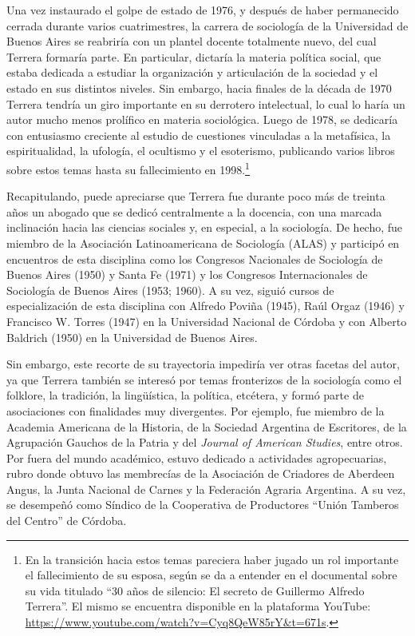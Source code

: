 Una vez instaurado el golpe de estado de 1976, y después de haber permanecido cerrada durante varios cuatrimestres, la carrera de sociología de la Universidad de Buenos Aires se reabriría con un plantel docente totalmente nuevo, del cual Terrera formaría parte. En particular, dictaría la materia política social, que estaba dedicada a estudiar la organización y articulación de la sociedad y el estado en sus distintos niveles. Sin embargo, hacia finales de la década de 1970 Terrera tendría un giro importante en su derrotero intelectual, lo cual lo haría un autor mucho menos prolífico en materia sociológica. Luego de 1978, se dedicaría con entusiasmo creciente al estudio de cuestiones vinculadas a la metafísica, la espiritualidad, la ufología, el ocultismo y el esoterismo, publicando varios libros sobre estos temas hasta su fallecimiento en 1998.\footnote{En la transición hacia estos temas pareciera haber jugado un rol importante el fallecimiento de su esposa, según se da a entender en el documental sobre su vida titulado \enquote{30 años de silencio: El secreto de Guillermo Alfredo Terrera}. El mismo se encuentra disponible en la plataforma YouTube: \url{https://www.youtube.com/watch?v=Cyq8QeW85rY\&t=671s}.}

Recapitulando, puede apreciarse que Terrera fue durante poco más de treinta años un abogado que se dedicó centralmente a la docencia, con una marcada inclinación hacia las ciencias sociales y, en especial, a la sociología. De hecho, fue miembro de la Asociación Latinoamericana de Sociología (ALAS) y participó en encuentros de esta disciplina como los Congresos Nacionales de Sociología de Buenos Aires (1950) y Santa Fe (1971) y los Congresos Internacionales de Sociología de Buenos Aires (1953; 1960). A su vez, siguió cursos de especialización de esta disciplina con Alfredo Poviña (1945), Raúl Orgaz (1946) y Francisco W. Torres (1947) en la Universidad Nacional de Córdoba y con Alberto Baldrich (1950) en la Universidad de Buenos Aires.

Sin embargo, este recorte de su trayectoria impediría ver otras facetas del autor, ya que Terrera también se interesó por temas fronterizos de la sociología como el folklore, la tradición, la lingüística, la política, etcétera, y formó parte de asociaciones con finalidades muy divergentes. Por ejemplo, fue miembro de la Academia Americana de la Historia, de la Sociedad Argentina de Escritores, de la Agrupación Gauchos de la Patria y del \emph{Journal of American Studies}, entre otros. Por fuera del mundo académico, estuvo dedicado a actividades agropecuarias, rubro donde obtuvo las membrecías de la Asociación de Criadores de Aberdeen Angus, la Junta Nacional de Carnes y la Federación Agraria Argentina. A su vez, se desempeñó como Síndico de la Cooperativa de Productores \enquote{Unión Tamberos del Centro} de Córdoba.

